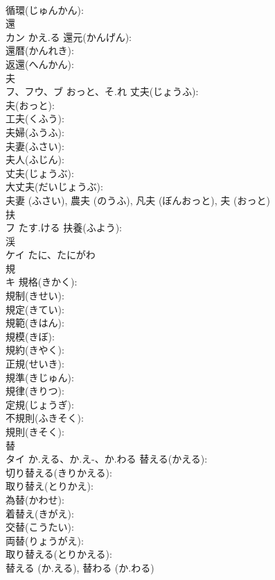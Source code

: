 \documentclass[8pt]{extreport}
\begin{document}
\begin{CJK}{UTF8}{min}
\\	循環(じゅんかん): 
\\	還			
\\	カン	かえ.る	還元(かんげん): 
\\	還暦(かんれき): 
\\	返還(へんかん): 
\\	夫			
\\	フ、フウ、ブ	おっと、そ.れ	丈夫(じょうふ): 
\\	夫(おっと): 
\\	工夫(くふう): 
\\	夫婦(ふうふ): 
\\	夫妻(ふさい): 
\\	夫人(ふじん): 
\\	丈夫(じょうぶ): 
\\	大丈夫(だいじょうぶ): 
\\	夫妻 (ふさい), 農夫 (のうふ), 凡夫 (ぼんおっと), 夫 (おっと)
\\	扶			
\\	フ	たす.ける	扶養(ふよう): 
\\	渓			
\\	ケイ	たに、たにがわ		
\\	規			
\\	キ		規格(きかく): 
\\	規制(きせい): 
\\	規定(きてい): 
\\	規範(きはん): 
\\	規模(きぼ): 
\\	規約(きやく): 
\\	正規(せいき): 
\\	規準(きじゅん): 
\\	規律(きりつ): 
\\	定規(じょうぎ): 
\\	不規則(ふきそく): 
\\	規則(きそく): 
\\	替			
\\	タイ	か.える、か.え-、か.わる	替える(かえる): 
\\	切り替える(きりかえる): 
\\	取り替え(とりかえ): 
\\	為替(かわせ): 
\\	着替え(きがえ): 
\\	交替(こうたい): 
\\	両替(りょうがえ): 
\\	取り替える(とりかえる): 
\\	替える (か.える), 替わる (か.わる)

\end{CJK}
\end{document}
